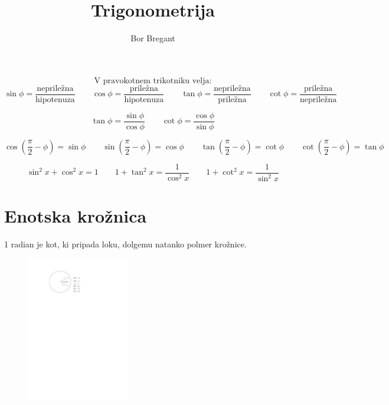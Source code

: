 \documentclass{article}
\title{Trigonometrija}
\author{Bor Bregant}
\date{\vspace{-5ex}}
\begin{document}
\maketitle

\[\text{V pravokotnem trikotniku velja:}\]
\[\sin\phi=\frac{\text{nepriležna}}{\text{hipotenuza}}\qquad \cos\phi=\frac{\text{priležna}}{\text{hipotenuza}}\qquad \tan\phi=\frac{\text{nepriležna}}{\text{priležna}}\qquad \cot\phi=\frac{\text{priležna}}{\text{nepriležna}}\]

\[\tan\phi=\frac{\sin\phi}{\cos\phi}\qquad \cot\phi=\frac{\cos\phi}{\sin\phi}\]

\[\cos(\frac{\pi}{2}-\phi)=\sin\phi \qquad \sin(\frac{\pi}{2}-\phi)=\cos\phi\qquad \tan(\frac{\pi}{2}-\phi)=\cot\phi\qquad \cot(\frac{\pi}{2}-\phi)=\tan\phi\]

\[\sin^2x+\cos^2x=1\qquad 1+\tan^2x=\frac{1}{\cos^2x}\qquad 1+\cot^2x=\frac{1}{\sin^2x}\]

\section{Enotska krožnica}

1 radian je kot, ki pripada loku, dolgemu natanko polmer krožnice.

\begin{figure}[H]
\includegraphics[width=0.4\textwidth]{trigonometrija.radiani.pdf}
\centering
\end{figure}
\end{document}
